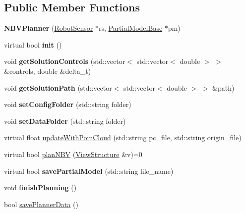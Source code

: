 \subsection*{Public Member Functions}
\begin{DoxyCompactItemize}
\item 
{\bfseries N\+B\+V\+Planner} (\hyperlink{classRobotSensor}{Robot\+Sensor} $\ast$rs, \hyperlink{classPartialModelBase}{Partial\+Model\+Base} $\ast$pm)\hypertarget{classNBVPlanner_afeaf82f7d6ee61346e796e26cd4730bb}{}\label{classNBVPlanner_afeaf82f7d6ee61346e796e26cd4730bb}

\item 
virtual bool {\bfseries init} ()\hypertarget{classNBVPlanner_aee188426e3324afa0875c7b030370d73}{}\label{classNBVPlanner_aee188426e3324afa0875c7b030370d73}

\item 
void {\bfseries get\+Solution\+Controls} (std\+::vector$<$ std\+::vector$<$ double $>$ $>$ \&controls, double \&delta\+\_\+t)\hypertarget{classNBVPlanner_a674fb1af1257cd3ce5aa0508f5c53ff0}{}\label{classNBVPlanner_a674fb1af1257cd3ce5aa0508f5c53ff0}

\item 
void {\bfseries get\+Solution\+Path} (std\+::vector$<$ std\+::vector$<$ double $>$ $>$ \&path)\hypertarget{classNBVPlanner_a68515cd88fcadd94e51c625be381ff75}{}\label{classNBVPlanner_a68515cd88fcadd94e51c625be381ff75}

\item 
void {\bfseries set\+Config\+Folder} (std\+::string folder)\hypertarget{classNBVPlanner_a8c8809f55beee71c693c3da15fc92b33}{}\label{classNBVPlanner_a8c8809f55beee71c693c3da15fc92b33}

\item 
void {\bfseries set\+Data\+Folder} (std\+::string folder)\hypertarget{classNBVPlanner_abaf6c50fd3e63cdab95703d73aeb13fe}{}\label{classNBVPlanner_abaf6c50fd3e63cdab95703d73aeb13fe}

\item 
virtual float \hyperlink{classNBVPlanner_a97e09f3acac040f3bd1bfc990fc1fce4}{update\+With\+Poin\+Cloud} (std\+::string pc\+\_\+file, std\+::string origin\+\_\+file)
\item 
virtual bool \hyperlink{classNBVPlanner_a448567c9d5cec319c5df5efdb0d5479c}{plan\+N\+BV} (\hyperlink{classViewStructure}{View\+Structure} \&v)=0
\item 
virtual bool {\bfseries save\+Partial\+Model} (std\+::string file\+\_\+name)\hypertarget{classNBVPlanner_a452136c3c1637976cbf2996d6006e27a}{}\label{classNBVPlanner_a452136c3c1637976cbf2996d6006e27a}

\item 
void {\bfseries finish\+Planning} ()\hypertarget{classNBVPlanner_a4cf0672ba39ae9dc42e64230d744a4bd}{}\label{classNBVPlanner_a4cf0672ba39ae9dc42e64230d744a4bd}

\item 
bool \hyperlink{classNBVPlanner_abf09392a8294aa537c7adda5f302d2e7}{save\+Planner\+Data} ()
\end{DoxyCompactItemize}
